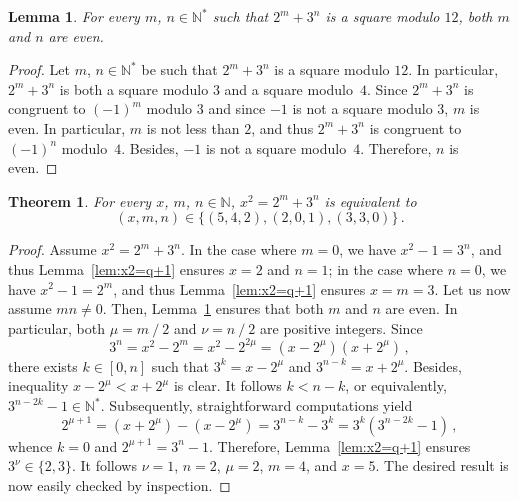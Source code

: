 \documentclass[12pt]{article}
\newcommand{\bZ}{\mathbb{Z}}
\newcommand{\bN}{\mathbb{N}} %
\newcommand{\bNast}{\bN^*}
\newcommand{\binover}{\mathbin{/}}
\newtheorem{theorem}{Theorem}
\newtheorem{lemma}{Lemma}
\theoremstyle{definition}
\begin{document}
   
   \begin{lemma} \label{lem:2m+3n-square-mod-12}
     For every $m$, $n \in \bNast$ such that $2^m + 3^n$ is a square modulo $12$,
     both $m$ and $n$ are even.
   \end{lemma}

   \begin{proof}
     Let $m$, $n \in \bNast$ be such that $2^m + 3^n$ is a square modulo $12$.
     In particular, $2^m + 3^n$ is both a square modulo $3$ and a square modulo~$4$.
     Since $2^m + 3^n$ is congruent to ${(- 1)}^m$ modulo $3$ and since $- 1$ is not a square modulo $3$,
     $m$ is even.
     In particular, $m$ is not less than $2$, and thus $2^m + 3^n$ is congruent to ${(- 1)}^n$ modulo~$4$.
     Besides, $- 1$ is not a square modulo~$4$.
     Therefore, $n$ is even.
   \end{proof}

   \begin{theorem}
     For every $x$, $m$, $n \in \bN$,
     $x^2 = 2^m + 3^n$ is equivalent to
     $$
     (x, m, n) \in \{  (5, 4, 2), (2, 0, 1), (3, 3, 0) \} \, .
     $$
   \end{theorem}
   
   \begin{proof}
     Assume $x^2 = 2^m + 3^n$.
     In the case where  $m = 0$,
     we have $x^2 - 1 = 3^n$,
     and thus Lemma~\ref{lem:x2=q+1} ensures $x = 2$ and $n = 1$;
     in the case where $n = 0$,
     we have $x^2 - 1 = 2^m$,
     and thus Lemma~\ref{lem:x2=q+1} ensures $x = m = 3$.
     Let us now assume $mn \ne 0$.
     Then, Lemma~\ref{lem:2m+3n-square-mod-12} ensures that both $m$ and $n$ are even.
     In particular, both $\mu = m \binover 2$ and $\nu = n \binover 2$ are positive integers.
     Since 
     $$
     3^n = x^2 - 2^m = x^2 - 2^{2\mu} = (x - 2^\mu)(x + 2^\mu) \,, 
     $$
     there exists $k \in [0, n]$ such that $3^k = x - 2^\mu$ and $3^{n - k} = x + 2^\mu$.
     Besides, inequality $x - 2^\mu < x + 2^\mu$ is clear. 
     It follows $k < n - k$, or equivalently, $3^{n - 2 k} - 1 \in \bNast$.
     Subsequently, straightforward computations yield
     $$
     2^{\mu + 1} = (x + 2^\mu) - (x - 2^\mu) = 3^{n - k} - 3^k = 3^k \left( 3^{n - 2k} - 1 \right) \,,
     $$
     whence $k = 0$ and $2^{\mu + 1} = 3^n - 1$.
     Therefore, 
     Lemma~\ref{lem:x2=q+1} ensures $3^\nu \in \{ 2, 3 \}$.
     It follows $\nu = 1$, $n = 2$, $\mu = 2$, $m = 4$, and $x = 5$.
     The desired result is now easily checked by inspection. 
  \end{proof}
\end{document}

